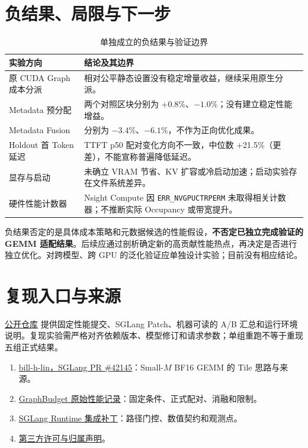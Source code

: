 \documentclass[UTF8,11pt,a4paper,fontset=none]{ctexart}
\begin{document}
\section{负结果、局限与下一步}
\begin{table}[H]\centering\small
\caption{单独成立的负结果与验证边界}\begin{tabularx}{\textwidth}{@{}p{}X@{}}\toprule
实验方向 & 结论及其边界 \\\midrule
原 CUDA Graph 成本分派 & 相对公平静态设置没有稳定增量收益，继续采用原生分派。 \\
Metadata 预分配 & 两个对照区块分别为 +0.8\%、$-1.0$\%；没有建立稳定性能增益。 \\
Metadata Fusion & 分别为 $-3.4$\%、$-6.1$\%，不作为正向优化成果。 \\
Holdout 首 Token 延迟 & TTFT p50 配对变化方向不一致，中位数 +21.5\%（更差），不能宣称普遍降低延迟。 \\
显存与启动 & 未确立 VRAM 节省、KV 扩容或冷启动加速；启动实验存在文件系统差异。 \\
硬件性能计数器 & Nsight Compute 因 \texttt{ERR\_NVGPUCTRPERM} 未取得相关计数器；不推断实际 Occupancy 或带宽提升。 \\\bottomrule\end{tabularx}\end{table}

负结果否定的是具体成本策略和元数据候选的性能假设，\textbf{不否定已独立完成验证的 GEMM 适配结果}。后续应通过剖析确定新的高贡献性能热点，再决定是否进行独立优化。对跨模型、跨 GPU 的泛化验证应单独设计实验；目前没有相应结论。

\section{复现入口与来源}
\href{https://github.com/yu830/graph-budget-runtime}{公开仓库} 提供固定性能提交、SGLang Patch、机器可读的 A/B 汇总和运行环境说明。复现实验需严格对齐依赖版本、模型修订和请求参数；单组重跑不等于重现五组正式结果。
\begin{enumerate}[leftmargin=1.6em,itemsep=.18em]
\item \href{https://github.com/sgl-project/sglang/pull/42145}{bill-h-lin，SGLang PR \#42145}：Small-$M$ BF16 GEMM 的 Tile 思路与来源。
\item \href{https://github.com/yu830/graph-budget-runtime/blob/1f1984147608ee6c5dd8b3423e6f41877aaadeb4/docs/PERFORMANCE_RESULTS_20261027.md}{GraphBudget 原始性能记录}：固定条件、正式配对、消融和限制。
\item \href{https://github.com/yu830/graph-budget-runtime/blob/1f1984147608ee6c5dd8b3423e6f41877aaadeb4/src/graphbudget/patches/sglang-v0.5.9.patch}{SGLang Runtime 集成补丁}：路径门控、数值契约和观测点。
\item \href{https://github.com/yu830/graph-budget-runtime/blob/1f1984147608ee6c5dd8b3423e6f41877aaadeb4/THIRD_PARTY_NOTICES.md}{第三方许可与归属声明}。
\end{enumerate}
\end{document}
